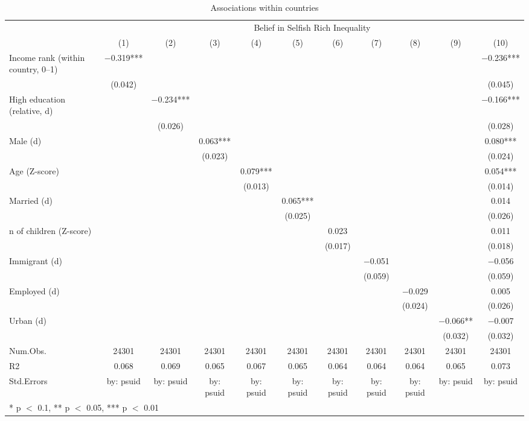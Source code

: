 \begin{table}

\caption{Associations within countries}
\centering
\begin{tabular}[t]{lcccccccccc}
\toprule
\multicolumn{1}{c}{ } & \multicolumn{10}{c}{Belief in Selfish Rich Inequality} \\
\cmidrule(l{3pt}r{3pt}){2-11}
  & (1) & (2) & (3) & (4) & (5) & (6) & (7) & (8) & (9) & (10)\\
\midrule
Income rank (within country, 0--1) & \num{-0.319}*** &  &  &  &  &  &  &  &  & \num{-0.236}***\\
 & (\num{0.042}) &  &  &  &  &  &  &  &  & (\num{0.045})\\
High education (relative, d) &  & \num{-0.234}*** &  &  &  &  &  &  &  & \num{-0.166}***\\
 &  & (\num{0.026}) &  &  &  &  &  &  &  & (\num{0.028})\\
Male (d) &  &  & \num{0.063}*** &  &  &  &  &  &  & \num{0.080}***\\
 &  &  & (\num{0.023}) &  &  &  &  &  &  & (\num{0.024})\\
Age (Z-score) &  &  &  & \num{0.079}*** &  &  &  &  &  & \num{0.054}***\\
 &  &  &  & (\num{0.013}) &  &  &  &  &  & (\num{0.014})\\
Married (d) &  &  &  &  & \num{0.065}*** &  &  &  &  & \num{0.014}\\
 &  &  &  &  & (\num{0.025}) &  &  &  &  & (\num{0.026})\\
n of children (Z-score) &  &  &  &  &  & \num{0.023} &  &  &  & \num{0.011}\\
 &  &  &  &  &  & (\num{0.017}) &  &  &  & (\num{0.018})\\
Immigrant (d) &  &  &  &  &  &  & \num{-0.051} &  &  & \num{-0.056}\\
 &  &  &  &  &  &  & (\num{0.059}) &  &  & (\num{0.059})\\
Employed (d) &  &  &  &  &  &  &  & \num{-0.029} &  & \num{0.005}\\
 &  &  &  &  &  &  &  & (\num{0.024}) &  & (\num{0.026})\\
Urban (d) &  &  &  &  &  &  &  &  & \num{-0.066}** & \num{-0.007}\\
 &  &  &  &  &  &  &  &  & (\num{0.032}) & (\num{0.032})\\
\midrule
Num.Obs. & \num{24301} & \num{24301} & \num{24301} & \num{24301} & \num{24301} & \num{24301} & \num{24301} & \num{24301} & \num{24301} & \num{24301}\\
R2 & \num{0.068} & \num{0.069} & \num{0.065} & \num{0.067} & \num{0.065} & \num{0.064} & \num{0.064} & \num{0.064} & \num{0.065} & \num{0.073}\\
Std.Errors & by: psuid & by: psuid & by: psuid & by: psuid & by: psuid & by: psuid & by: psuid & by: psuid & by: psuid & by: psuid\\
\bottomrule
\multicolumn{11}{l}{\rule{0pt}{1em}* p $<$ 0.1, ** p $<$ 0.05, *** p $<$ 0.01}\\
\end{tabular}
\end{table}
